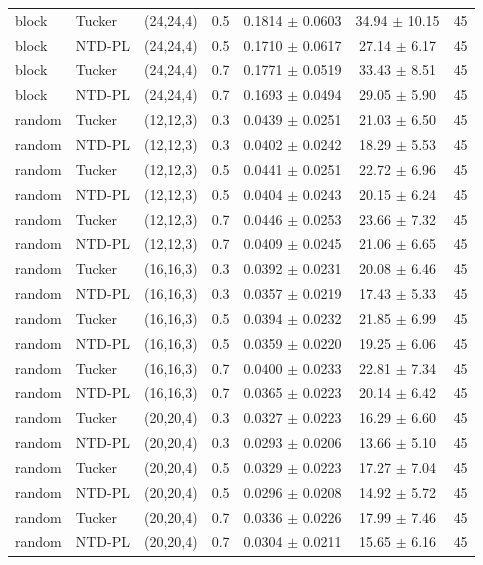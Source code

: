 \begin{tabular}{@{}l l c c c c c@{}}
block & Tucker & (24,24,4) & 0.5 & 0.1814 $\pm$ 0.0603 & 34.94 $\pm$ 10.15 & 45\\
block & NTD-PL & (24,24,4) & 0.5 & 0.1710 $\pm$ 0.0617 & 27.14 $\pm$ 6.17 & 45\\
block & Tucker & (24,24,4) & 0.7 & 0.1771 $\pm$ 0.0519 & 33.43 $\pm$ 8.51 & 45\\
block & NTD-PL & (24,24,4) & 0.7 & 0.1693 $\pm$ 0.0494 & 29.05 $\pm$ 5.90 & 45\\
random & Tucker & (12,12,3) & 0.3 & 0.0439 $\pm$ 0.0251 & 21.03 $\pm$ 6.50 & 45\\
random & NTD-PL & (12,12,3) & 0.3 & 0.0402 $\pm$ 0.0242 & 18.29 $\pm$ 5.53 & 45\\
random & Tucker & (12,12,3) & 0.5 & 0.0441 $\pm$ 0.0251 & 22.72 $\pm$ 6.96 & 45\\
random & NTD-PL & (12,12,3) & 0.5 & 0.0404 $\pm$ 0.0243 & 20.15 $\pm$ 6.24 & 45\\
random & Tucker & (12,12,3) & 0.7 & 0.0446 $\pm$ 0.0253 & 23.66 $\pm$ 7.32 & 45\\
random & NTD-PL & (12,12,3) & 0.7 & 0.0409 $\pm$ 0.0245 & 21.06 $\pm$ 6.65 & 45\\
random & Tucker & (16,16,3) & 0.3 & 0.0392 $\pm$ 0.0231 & 20.08 $\pm$ 6.46 & 45\\
random & NTD-PL & (16,16,3) & 0.3 & 0.0357 $\pm$ 0.0219 & 17.43 $\pm$ 5.33 & 45\\
random & Tucker & (16,16,3) & 0.5 & 0.0394 $\pm$ 0.0232 & 21.85 $\pm$ 6.99 & 45\\
random & NTD-PL & (16,16,3) & 0.5 & 0.0359 $\pm$ 0.0220 & 19.25 $\pm$ 6.06 & 45\\
random & Tucker & (16,16,3) & 0.7 & 0.0400 $\pm$ 0.0233 & 22.81 $\pm$ 7.34 & 45\\
random & NTD-PL & (16,16,3) & 0.7 & 0.0365 $\pm$ 0.0223 & 20.14 $\pm$ 6.42 & 45\\
random & Tucker & (20,20,4) & 0.3 & 0.0327 $\pm$ 0.0223 & 16.29 $\pm$ 6.60 & 45\\
random & NTD-PL & (20,20,4) & 0.3 & 0.0293 $\pm$ 0.0206 & 13.66 $\pm$ 5.10 & 45\\
random & Tucker & (20,20,4) & 0.5 & 0.0329 $\pm$ 0.0223 & 17.27 $\pm$ 7.04 & 45\\
random & NTD-PL & (20,20,4) & 0.5 & 0.0296 $\pm$ 0.0208 & 14.92 $\pm$ 5.72 & 45\\
random & Tucker & (20,20,4) & 0.7 & 0.0336 $\pm$ 0.0226 & 17.99 $\pm$ 7.46 & 45\\
random & NTD-PL & (20,20,4) & 0.7 & 0.0304 $\pm$ 0.0211 & 15.65 $\pm$ 6.16 & 45\\

\end{tabular}
